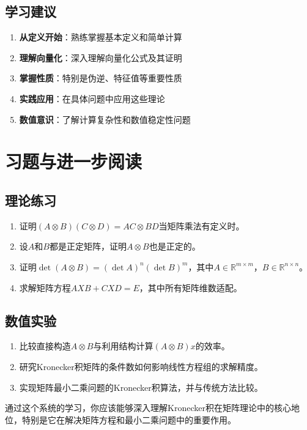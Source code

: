 \documentclass[11pt,a4paper]{ctexart}
\theoremstyle{definition}
\newcommand{\RR}{\mathbb{R}}
\begin{document}
\subsection{学习建议}

\begin{enumerate}
\item \textbf{从定义开始}：熟练掌握基本定义和简单计算
\item \textbf{理解向量化}：深入理解向量化公式及其证明
\item \textbf{掌握性质}：特别是伪逆、特征值等重要性质
\item \textbf{实践应用}：在具体问题中应用这些理论
\item \textbf{数值意识}：了解计算复杂性和数值稳定性问题
\end{enumerate}

\section{习题与进一步阅读}

\subsection{理论练习}

\begin{enumerate}
\item 证明$(A \otimes B)(C \otimes D) = AC \otimes BD$当矩阵乘法有定义时。

\item 设$A$和$B$都是正定矩阵，证明$A \otimes B$也是正定的。

\item 证明$\det(A \otimes B) = (\det A)^n (\det B)^m$，其中$A \in \RR^{m \times m}$，$B \in \RR^{n \times n}$。

\item 求解矩阵方程$AXB + CXD = E$，其中所有矩阵维数适配。
\end{enumerate}

\subsection{数值实验}

\begin{enumerate}
\item 比较直接构造$A \otimes B$与利用结构计算$(A \otimes B)x$的效率。

\item 研究Kronecker积矩阵的条件数如何影响线性方程组的求解精度。

\item 实现矩阵最小二乘问题的Kronecker积算法，并与传统方法比较。
\end{enumerate}

通过这个系统的学习，你应该能够深入理解Kronecker积在矩阵理论中的核心地位，特别是它在解决矩阵方程和最小二乘问题中的重要作用。
\end{document}
